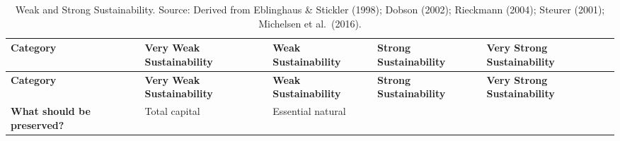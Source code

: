 \documentclass[
  a4paper,
  openany]{book}
\begin{document}
\begin{longtable}[]{@{}
  >{\raggedright\arraybackslash}p{}
  >{\raggedright\arraybackslash}p{}
  >{\raggedright\arraybackslash}p{}
  >{\raggedright\arraybackslash}p{}
  >{\raggedright\arraybackslash}p{}@{}}
\caption{Weak and Strong Sustainability. Source: Derived from Eblinghaus
\& Stickler (1998); Dobson (2002); Rieckmann (2004); Steurer (2001);
Michelsen et al.~(2016).}\tabularnewline
\toprule\noalign{}
\begin{minipage}[b]{\linewidth}\raggedright
\textbf{Category}
\end{minipage} & \begin{minipage}[b]{\linewidth}\raggedright
\textbf{Very Weak Sustainability}
\end{minipage} & \begin{minipage}[b]{\linewidth}\raggedright
\textbf{Weak Sustainability}
\end{minipage} & \begin{minipage}[b]{\linewidth}\raggedright
\textbf{Strong Sustainability}
\end{minipage} & \begin{minipage}[b]{\linewidth}\raggedright
\textbf{Very Strong Sustainability}
\end{minipage} \\
\midrule\noalign{}
\endfirsthead
\toprule\noalign{}
\begin{minipage}[b]{\linewidth}\raggedright
\textbf{Category}
\end{minipage} & \begin{minipage}[b]{\linewidth}\raggedright
\textbf{Very Weak Sustainability}
\end{minipage} & \begin{minipage}[b]{\linewidth}\raggedright
\textbf{Weak Sustainability}
\end{minipage} & \begin{minipage}[b]{\linewidth}\raggedright
\textbf{Strong Sustainability}
\end{minipage} & \begin{minipage}[b]{\linewidth}\raggedright
\textbf{Very Strong Sustainability}
\end{minipage} \\
\midrule\noalign{}
\endhead
\bottomrule\noalign{}
\endlastfoot
\textbf{What should be preserved?} & Total capital & Essential natural

\end{longtable}
\end{document}
